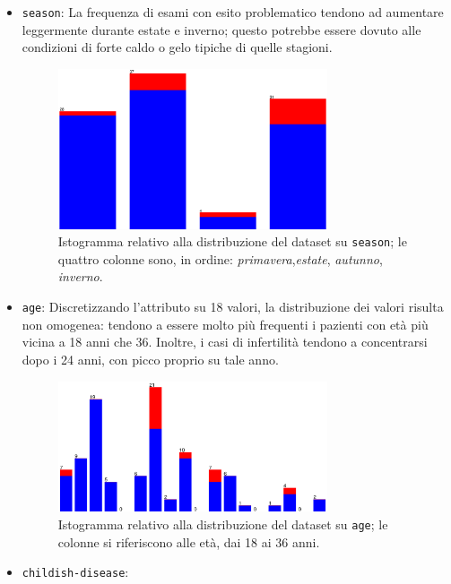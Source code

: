 \begin{itemize}
  \item \texttt{season}:
    La frequenza di esami con esito problematico tendono ad aumentare leggermente durante estate e inverno;
    questo potrebbe essere dovuto alle condizioni di forte caldo o gelo tipiche di quelle stagioni.
    \begin{figure}[H]
      \centering
      \includegraphics[width=0.75\textwidth]{fig/season.eps}%
      \caption{%
        Istogramma relativo alla distribuzione del dataset su \texttt{season};
        le quattro colonne sono, in ordine: \emph{primavera},\emph{estate}, \emph{autunno}, \emph{inverno}.
      }%
      \label{fig:season}
    \end{figure}
  \item \texttt{age}:
    Discretizzando l'attributo su 18 valori, la distribuzione dei valori risulta non omogenea:
    tendono a essere molto più frequenti i pazienti con età più vicina a 18 anni che 36.
    Inoltre, i casi di infertilità tendono a concentrarsi dopo i 24 anni, con picco proprio su tale anno.
    \begin{figure}[H]
      \centering
      \includegraphics[width=0.75\textwidth]{fig/age-discrete.eps}%
      \caption{%
        Istogramma relativo alla distribuzione del dataset su \texttt{age};
        le colonne si riferiscono alle età, dai 18 ai 36 anni.
      }%
      \label{fig:age}
    \end{figure}
  \item \texttt{childish-disease}:

\end{itemize}
